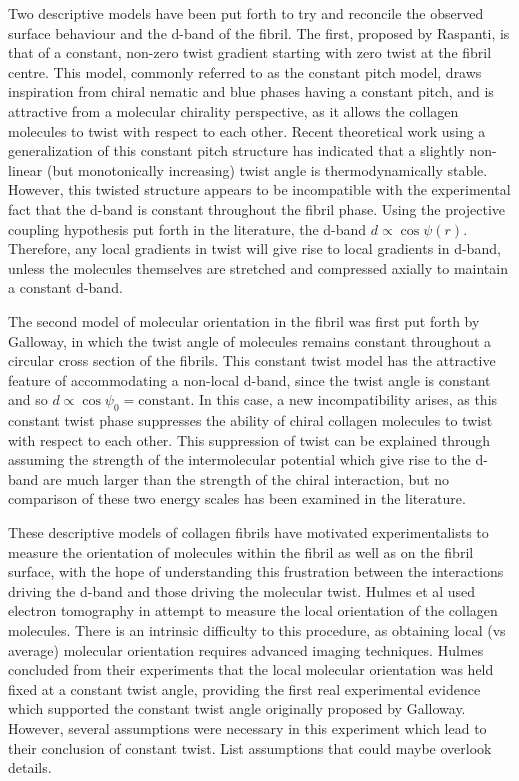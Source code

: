 \documentclass[%
 reprint,
 amsmath,amssymb,
 aps,
]{revtex4-1}
\begin{document}
Two descriptive models have been put forth to try and reconcile the observed surface behaviour and the d-band of the fibril. The first, proposed by Raspanti, is that of a constant, non-zero twist gradient starting with zero twist at the fibril centre. This model, commonly referred to as the constant pitch model, draws inspiration from chiral nematic and blue phases having a constant pitch, and is attractive from a molecular chirality perspective, as it allows the collagen molecules to twist with respect to each other. Recent theoretical work using a generalization of this constant pitch structure has indicated that a slightly non-linear (but monotonically increasing) twist angle is thermodynamically stable. However, this twisted structure appears to be incompatible with the experimental fact that the d-band is constant throughout the fibril phase. Using the projective coupling hypothesis put forth in the literature, the d-band $d\propto\cos\psi(r)$. Therefore, any local gradients in twist will give rise to local gradients in d-band, unless the molecules themselves are stretched and compressed axially to maintain a constant d-band.

The second model of molecular orientation in the fibril was first put forth by Galloway, in which the twist angle of molecules remains constant throughout a circular cross section of the fibrils. This constant twist model has the attractive feature of accommodating a non-local d-band, since the twist angle is constant and so $d\propto\cos\psi_0=\textrm{constant}$. In this case, a new incompatibility arises, as this constant twist phase suppresses the ability of chiral collagen molecules to twist with respect to each other. This suppression of twist can be explained through assuming the strength of the intermolecular potential which give rise to the d-band are much larger than the strength of the chiral interaction, but no comparison of these two energy scales has been examined in the literature.

These descriptive models of collagen fibrils have motivated experimentalists to measure the orientation of molecules within the fibril as well as on the fibril surface, with the hope of understanding this frustration between the interactions driving the d-band and those driving the molecular twist. Hulmes et al used electron tomography in attempt to measure the local orientation of the collagen molecules. There is an intrinsic difficulty to this procedure, as obtaining local (vs average) molecular orientation requires advanced imaging techniques. Hulmes concluded from their experiments that the local molecular orientation was held fixed at a constant twist angle, providing the first real experimental evidence which supported the constant twist angle originally proposed by Galloway. However, several assumptions were necessary in this experiment which lead to their conclusion of constant twist. List assumptions that could maybe overlook details.
\end{document}
